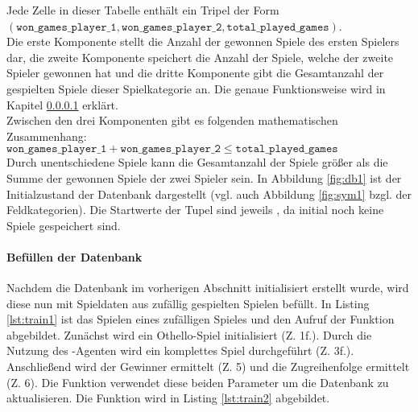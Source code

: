 Jede Zelle in dieser Tabelle enthält ein Tripel der Form \\$( \mathtt{won\_games\_player\_1}, \mathtt{won\_games\_player\_2}, \mathtt{total\_played\_games})$. 
\\Die erste Komponente stellt die Anzahl der gewonnen Spiele des ersten Spielers dar, die zweite Komponente speichert die Anzahl der Spiele, welche der zweite Spieler gewonnen hat und die dritte Komponente gibt die Gesamtanzahl der gespielten Spiele dieser Spielkategorie an. Die genaue Funktionsweise wird in Kapitel \ref{train} erklärt.
\\Zwischen den drei Komponenten gibt es folgenden mathematischen Zusammenhang: 
\\$\mathtt{won\_games\_player\_1} + \mathtt{won\_games\_player\_2} \le \mathtt{total\_played\_games}$
\\Durch unentschiedene Spiele kann die Gesamtanzahl der Spiele größer als die Summe der gewonnen Spiele der zwei Spieler sein.
In Abbildung \ref{fig:db1} ist der Initialzustand der Datenbank dargestellt (vgl. auch Abbildung \ref{fig:sym1} bzgl. der Feldkategorien). Die Startwerte der Tupel sind jeweils , da initial noch keine Spiele gespeichert sind.
\\

\paragraph{Befüllen der Datenbank}
\label{train}
Nachdem die Datenbank im vorherigen Abschnitt initialisiert erstellt wurde, wird diese nun mit Spieldaten aus zufällig gespielten Spielen befüllt. In Listing \ref{lst:train1} ist das Spielen eines zufälligen Spieles und den Aufruf der Funktion  abgebildet. Zunächst wird ein Othello-Spiel initialisiert (Z. 1f.). Durch die Nutzung des -Agenten wird ein komplettes Spiel durchgeführt (Z. 3f.). Anschließend wird der Gewinner ermittelt (Z. 5) und die Zugreihenfolge ermittelt (Z. 6). Die Funktion  verwendet diese beiden Parameter um die Datenbank zu aktualisieren. Die Funktion wird in Listing \ref{lst:train2} abgebildet.

